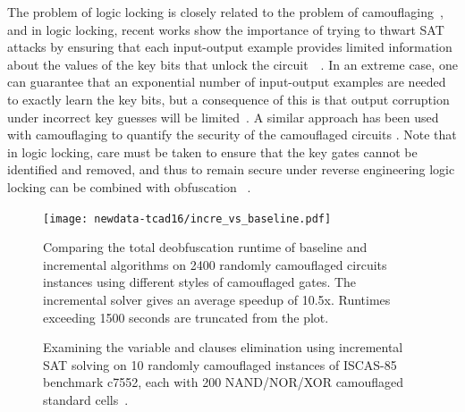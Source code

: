 \documentclass[proposal]{umassthesis}  %
\begin{document}
{The problem of logic locking is closely related to the problem of camouflaging~\cite{yasin-transforming}, and in logic locking, recent works show the importance of trying to thwart SAT attacks by ensuring that each input-output example provides limited information about the values of the key bits that unlock the circuit~\cite{yasin2016sarlock}~\cite{xie2016mitigatingsat}. In an extreme case, one can guarantee that an exponential number of input-output examples are needed to exactly learn the key bits, but a consequence of this is that output corruption under incorrect key guesses will be limited~\cite{yasin2016sarlock}. A similar approach has been used with camouflaging to quantify the security of the camouflaged circuits \cite{Yasin-iccad-16} \cite{MengLi-iccad-16}.  Note that in logic locking, care must be taken to ensure that the key gates cannot be identified and removed, and thus to remain secure under reverse engineering logic locking can be combined with obfuscation~\cite{yasin2016sarlock} \cite{shahzad-date17}}. 


\begin{figure}[!hbt]
  \centering
   \texttt{[image: newdata-tcad16/incre\_vs\_baseline.pdf]} 
    \caption{Comparing the total deobfuscation runtime of baseline and incremental algorithms on 2400 randomly camouflaged circuits instances using different styles of camouflaged gates. The incremental solver gives an average speedup of 10.5x. Runtimes exceeding 1500 seconds are truncated from the plot.}
        \vspace{-2mm}
    \label{fig:incre_vs_baseline}
  \end{figure}

\begin{figure}[!ht]
  \centering
    \hspace{20pt}
    \caption{Examining the variable and clauses elimination using incremental SAT solving on 10 randomly camouflaged instances of ISCAS-85 benchmark c7552, each with 200 NAND/NOR/XOR camouflaged standard cells~\cite{rajendran-13}.}
    \vspace{-2mm}
    \label{fig:study_incremental}
  \end{figure}
\end{document}
